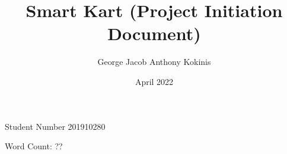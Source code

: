\documentclass[11pt, a4paper, notitlepage]{report}
\title{Smart Kart (Project Initiation Document)}
\date{April 2022}
\author{George Jacob Anthony Kokinis}
\begin{document}
\maketitle
\begin{center}
    Student Number 201910280
    
    Word Count: ?? %
\end{center}
\newpage
\end{document}
